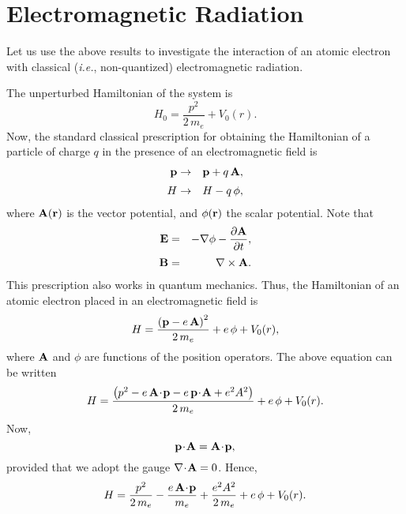 \section{Electromagnetic Radiation}
Let us use the above results to investigate the interaction of an atomic electron with 
classical ({\em i.e.}, non-quantized) electromagnetic radiation. 

The unperturbed Hamiltonian of the system
is
\begin{equation}\label{e6.239}
H_0 = \frac{p^2}{2 \,m_e} + V_0(r).
\end{equation}
Now, the standard classical prescription for obtaining the Hamiltonian of
a  particle
of charge $q$
in the presence of an electromagnetic field is
\begin{eqnarray}
{\bf p} &\rightarrow& {\bf p} + q\,{ \bf A},\\[0.5ex]
H &\rightarrow & H - q\,\phi,
\end{eqnarray}
where ${\bf A}(\bf r)$ is the vector potential, and $\phi({\bf r})$
the scalar potential. Note that
\begin{eqnarray}
{\bf E} &=&  - \nabla\phi - \frac{\partial {\bf A}}{\partial t},\\[0.5ex]
{\bf B} &=& \nabla\times {\bf A}.
\end{eqnarray}
This prescription also works in quantum mechanics. Thus, the Hamiltonian
of an atomic electron placed in an electromagnetic field is
\begin{equation}
H = \frac{\left({\bf p} - e\, {\bf A}\right)^2 }{2\,m_e}+ e \,\phi + V_0(r),
\end{equation}
where ${\bf A}$ and $\phi$ are functions of the position operators.
The above equation can be written
\begin{equation}
H = \frac{ \left(p^2 -e \,{\bf A}\!\cdot \! {\bf p}
-e \,{\bf p}\!\cdot\!{\bf A} + e^2 A^2\right)}{2\,m_e}+ e \,\phi + V_0(r).
\end{equation}
Now, 
\begin{equation}
{\bf p}\!\cdot\!{\bf A} = {\bf A}\!\cdot \! {\bf p},
\end{equation}
provided that we adopt the gauge $\nabla\!\cdot\!{\bf A} = 0$.
Hence,
\begin{equation}
H = \frac{p^2}{2\,m_e} -\frac{e\,{\bf A}\!\cdot\!{\bf p}}{m_e}
+\frac{ e^2  A^2}{2\,m_e}+ e\, \phi + V_0(r).
\end{equation}

